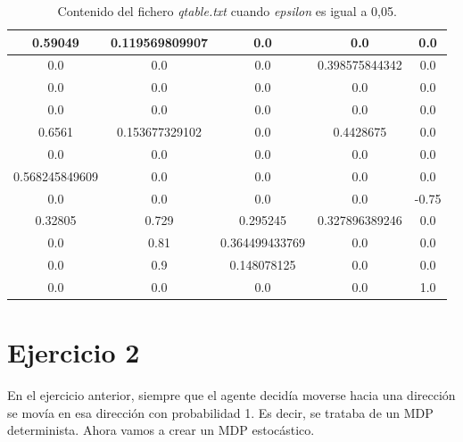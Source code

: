 \documentclass[11pt]{exam}
\begin{document}
\begin{questions}
\renewcommand{\tablename}{Tabla}
\begin{table}[h]
	\centering
	\begin{tabular}{|c|c|c|c|c|}
		\hline
		0.59049        & 0.119569809907 & 0.0            & 0.0            & 0.0   \\ \hline
		0.0            & 0.0            & 0.0            & 0.398575844342 & 0.0   \\ \hline
		0.0            & 0.0            & 0.0            & 0.0            & 0.0   \\ \hline
		0.0            & 0.0            & 0.0            & 0.0            & 0.0   \\ \hline
		0.6561         & 0.153677329102 & 0.0            & 0.4428675      & 0.0   \\ \hline
		0.0            & 0.0            & 0.0            & 0.0            & 0.0   \\ \hline
		0.568245849609 & 0.0            & 0.0            & 0.0            & 0.0   \\ \hline
		0.0            & 0.0            & 0.0            & 0.0            & -0.75 \\ \hline
		0.32805        & 0.729          & 0.295245       & 0.327896389246 & 0.0   \\ \hline
		0.0            & 0.81           & 0.364499433769 & 0.0            & 0.0   \\ \hline
		0.0            & 0.9            & 0.148078125    & 0.0            & 0.0   \\ \hline
		0.0            & 0.0            & 0.0            & 0.0            & 1.0   \\ \hline
	\end{tabular}
	\caption{Contenido del fichero \textit{qtable.txt} cuando \textit{epsilon} es igual a 0,05.}
	\label{table_1}
\end{table}

\end{questions}

\newpage

\section*{Ejercicio 2}

En el ejercicio anterior, siempre que el agente decidía moverse hacia una dirección se movía en esa dirección con probabilidad 1. Es decir, se trataba de un MDP determinista. Ahora vamos a crear un MDP estocástico.
\end{document}
